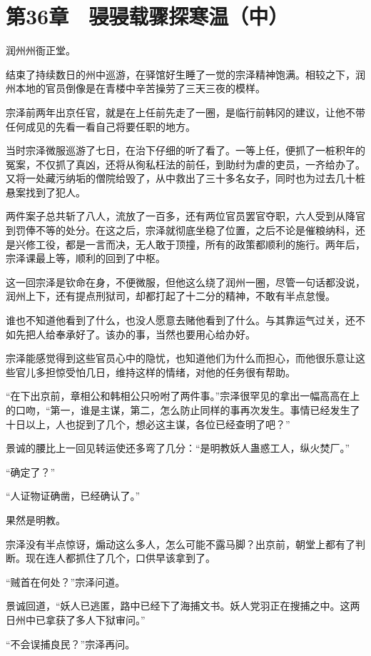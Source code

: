 \section{第36章　骎骎载骤探寒温（中）}

润州州衙正堂。

结束了持续数日的州中巡游，在驿馆好生睡了一觉的宗泽精神饱满。相较之下，润州本地的官员倒像是在青楼中辛苦操劳了三天三夜的模样。

宗泽前两年出京任官，就是在上任前先走了一圈，是临行前韩冈的建议，让他不带任何成见的先看一看自己将要任职的地方。

当时宗泽微服巡游了七日，在治下仔细的听了看了。一等上任，便抓了一桩积年的冤案，不仅抓了真凶，还将从徇私枉法的前任，到助纣为虐的吏员，一齐给办了。又将一处藏污纳垢的僧院给毁了，从中救出了三十多名女子，同时也为过去几十桩悬案找到了犯人。

两件案子总共斩了八人，流放了一百多，还有两位官员罢官夺职，六人受到从降官到罚俸不等的处分。在这之后，宗泽就彻底坐稳了位置，之后不论是催粮纳科，还是兴修工役，都是一言而决，无人敢于顶撞，所有的政策都顺利的施行。两年后，宗泽课最上等，顺利的回到了中枢。

这一回宗泽是钦命在身，不便微服，但他这么绕了润州一圈，尽管一句话都没说，润州上下，还有提点刑狱司，却都打起了十二分的精神，不敢有半点怠慢。

谁也不知道他看到了什么，也没人愿意去赌他看到了什么。与其靠运气过关，还不如先把人给奉承好了。该办的事，当然也要用心给办好。

宗泽能感觉得到这些官员心中的隐忧，也知道他们为什么而担心，而他很乐意让这些官儿多担惊受怕几日，维持这样的情绪，对他的任务很有帮助。

“在下出京前，章相公和韩相公只吩咐了两件事。”宗泽很罕见的拿出一幅高高在上的口吻，“第一，谁是主谋，第二，怎么防止同样的事再次发生。事情已经发生了十日以上，人也捉到了几个，想必这主谋，各位已经查明了吧？”

景诚的腰比上一回见转运使还多弯了几分：“是明教妖人蛊惑工人，纵火焚厂。”

“确定了？”

“人证物证确凿，已经确认了。”

果然是明教。

宗泽没有半点惊讶，煽动这么多人，怎么可能不露马脚？出京前，朝堂上都有了判断。现在连人都抓住了几个，口供早该拿到了。

“贼首在何处？”宗泽问道。

景诚回道，“妖人已逃匿，路中已经下了海捕文书。妖人党羽正在搜捕之中。这两日州中已拿获了多人下狱审问。”

“不会误捕良民？”宗泽再问。

